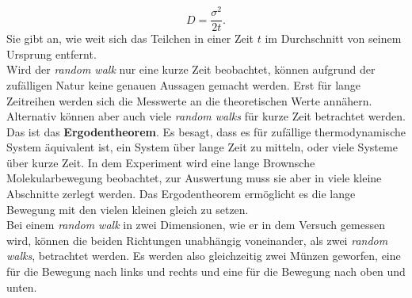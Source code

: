 \documentclass[a4paper, 12pt]{scrartcl}
\begin{document}
\begin{equation}
  D = \frac{\sigma^2}{2 t}. \label{eq:diff}
\end{equation}
Sie gibt an, wie weit sich das Teilchen in einer Zeit $t$ im Durchschnitt von seinem Ursprung entfernt.\\

Wird der \emph{random walk} nur eine kurze Zeit beobachtet, können aufgrund der zufälligen Natur keine genauen Aussagen gemacht werden. Erst für lange Zeitreihen werden sich die Messwerte an die theoretischen Werte annähern. Alternativ können aber auch viele \emph{random walks} für kurze Zeit betrachtet werden. Das ist das \textbf{Ergodentheorem}. Es besagt, dass es für zufällige thermodynamische System äquivalent ist, ein System über lange Zeit zu mitteln, oder viele Systeme über kurze Zeit. In dem Experiment wird eine lange Brownsche Molekularbewegung beobachtet, zur Auswertung muss sie aber in viele kleine Abschnitte zerlegt werden. Das Ergodentheorem ermöglicht es die lange Bewegung mit den vielen kleinen gleich zu setzen.\\
Bei einem \emph{random walk} in zwei Dimensionen, wie er in dem Versuch gemessen wird, können die beiden Richtungen unabhängig voneinander, als zwei \emph{random walks}, betrachtet werden. Es werden also gleichzeitig zwei Münzen geworfen, eine für die Bewegung nach links und rechts und eine für die Bewegung nach oben und unten.\\
\end{document}
